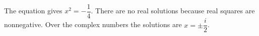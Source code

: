 The equation gives $x^2=-\dfrac{1}{4}$. There are no real solutions because real squares are nonnegative. Over the complex numbers the solutions are $\boxed{x=\pm\dfrac{i}{2}}$.

